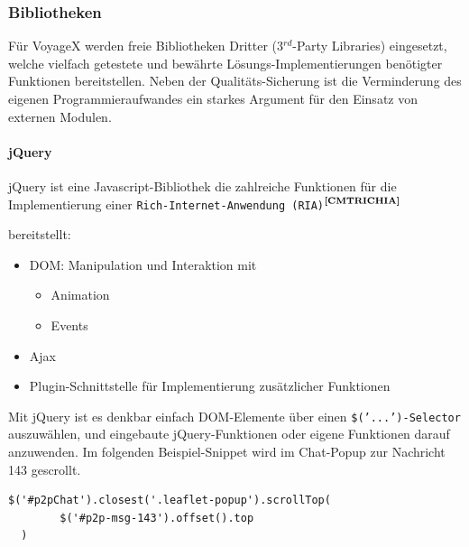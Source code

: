 
\subsubsection{Bibliotheken}
Für VoyageX werden freie Bibliotheken Dritter (3$^{rd}$-Party Libraries) eingesetzt, welche vielfach getestete und bewährte Lösungs-Implementierungen benötigter Funktionen bereitstellen. Neben der Qualitäts-Sicherung ist die Verminderung des eigenen Programmieraufwandes ein starkes Argument für den Einsatz von externen
Modulen.

\paragraph{jQuery}
jQuery ist eine Javascript-Bibliothek die zahlreiche Funktionen für die Implementierung einer \texttt{Rich-Internet-Anwendung (RIA)}$^{\textbf{\ref{CMTRICHIA}}}$%
\addtocounter{footnote}{1}%
 bereitstellt:
	\begin{itemize}
		\item DOM: Manipulation und Interaktion mit
		\begin{itemize}
			\item Animation
			\item Events
		\end{itemize}
		\item Ajax
		\item Plugin-Schnittstelle für Implementierung zusätzlicher Funktionen
	\end{itemize}
Mit jQuery ist es denkbar einfach DOM-Elemente über einen \texttt{\$('...')-Selector} auszuwählen, und eingebaute jQuery-Funktionen oder eigene Funktionen darauf anzuwenden. Im folgenden Beispiel-Snippet wird im Chat-Popup zur Nachricht 143 gescrollt.
\lstset{language=JavaScript}
\begin{lstlisting}[frame=single,xleftmargin=0pt,numbers=none]
$('#p2pChat').closest('.leaflet-popup').scrollTop(
		$('#p2p-msg-143').offset().top
  )
\end{lstlisting}

